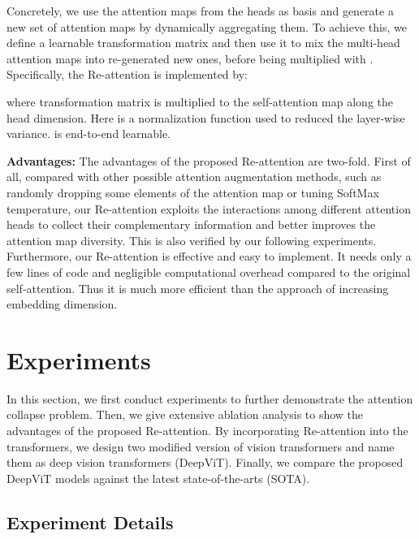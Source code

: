 \documentclass[10pt,twocolumn,letterpaper]{article}
\newcommand{\nameofatten}{Re-attention}
\newcommand{\myPara}[1]{\vspace{.05in}\noindent\textbf{#1}}
\begin{document}
Concretely, we  use the attention maps from the heads as basis and generate a new set of attention maps by dynamically aggregating them. To achieve this, we define a learnable transformation matrix  and then use it to mix the multi-head attention maps into  re-generated new ones,  before being multiplied with . Specifically, the \nameofatten{} is implemented by:

where transformation matrix  is multiplied to the self-attention map  along the head dimension. Here  is a normalization
function used to reduced the layer-wise variance.  is end-to-end learnable. 




\myPara{Advantages:} 
The advantages of the proposed \nameofatten{} are two-fold.
First of all, compared with other  possible attention augmentation methods,
such as randomly dropping some elements of the attention map or tuning  SoftMax temperature,
our \nameofatten{} exploits the interactions among different
attention heads  to collect their complementary information  and better improves the attention map diversity. This is  also verified by our  following experiments.
Furthermore, our \nameofatten{} is effective and easy to implement.
It needs only a few lines of code and negligible computational overhead
compared to the original self-attention. Thus it is much more efficient than the approach of increasing embedding dimension. 








 \section{Experiments}
\label{exp:experiments}



In this section, we first conduct experiments to further demonstrate the attention collapse
problem. Then, we give extensive ablation analysis to show the advantages of the proposed \nameofatten{}. By incorporating \nameofatten{} into the transformers, we design two modified version of vision transformers and name them as deep vision transformers (DeepViT). Finally, we compare the proposed DeepViT models against the latest state-of-the-arts (SOTA).

\subsection{Experiment Details}
\end{document}
